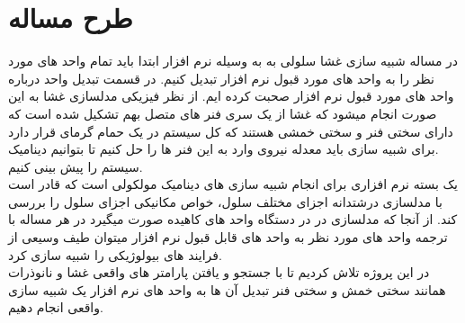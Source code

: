 \documentclass[12pt,onecolumn,a4paper]{report}
\begin{document}
\section{\LARGE{طرح مساله}}
در مساله شبیه سازی غشا سلولی به به وسیله نرم افزار ابتدا باید تمام واحد های مورد نظر را به واحد های مورد قبول نرم افزار تبدیل کنیم. در قسمت تبدیل واحد درباره واحد های مورد قبول نرم افزار صحبت کرده ایم. از نظر فیزیکی مدلسازی غشا به این صورت انجام میشود که غشا از یک سری فنر های متصل  بهم تشکیل شده است که دارای سختی فنر و سختی خمشی هستند که کل سیستم در یک حمام گرمای قرار دارد .برای شبیه سازی باید معدله نیروی وارد به این فنر ها را حل کنیم تا بتوانیم دینامیک سیستم را پیش بینی کنیم.\\

 یک بسته نرم افزاری برای انجام شبیه سازی های دینامیک مولکولی است که قادر است
با مدلسازی درشتدانه اجزای مختلف سلول، خواص مکانیکی اجزای سلول را بررسی کند.
از آنجا که مدلسازی در  در دستگاه واحد های کاهیده صورت میگیرد در هر مساله با ترجمه واحد های مورد نظر به واحد های قابل قبول نرم افزار میتوان طیف وسیعی از فرایند های بیولوژیکی را شبیه سازی کرد.\\
در این پروژه تلاش کردیم تا با جستجو و یافتن پارامتر های واقعی غشا و نانوذرات همانند سختی خمش و سختی فنر  تبدیل آن ها به واحد های نرم افزار یک شبیه سازی واقعی انجام دهیم.
\end{document}
